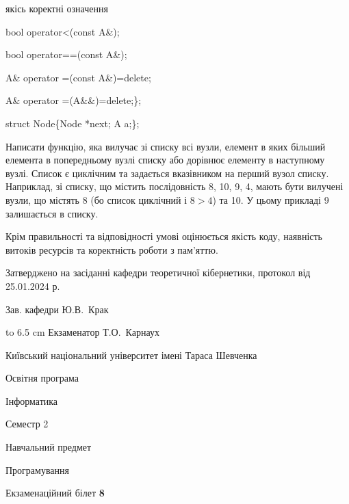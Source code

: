 \documentclass[12pt, ukrainian]{article}
\begin{document}
{\quad  якісь коректні означення 

\quad  bool operator<(const A\&); 

\quad  bool operator==(const A\&); 

\quad A\& operator =(const A\&)=delete; 

\quad  A\& operator =(A\&\&)=delete;\};

struct Node\{Node *next; A a;\};

 Написати функцію, яка вилучає зі списку всі вузли, елемент в яких більший елемента в попередньому вузлі списку або дорівнює елементу в наступному вузлі. Список є циклічним та задається вказівником на перший вузол списку. Наприклад, зі списку, що містить послідовність 8, 10, 9, 4, мають бути вилучені вузли, що містять 8 (бо список циклічний і $8>4$) та 10. У цьому прикладі 9 залишається в списку.

Крім правильності та відповідності умові оцінюється якість коду, наявність витоків ресурсів та коректність роботи з пам'яттю. 

}
{\smallskip\smallskip \begin {scriptsize} Затверджено на засіданні кафедри теоретичної кібернетики, протокол   від   25.01.2024 р.\par\smallskip\smallskip\smallskip\smallskip
{\parbox {6.5 cm} {Зав. кафедри \dotfill Ю.В.~Крак}}\hspace {0.7cm} {\hbox to 6.5 cm { Екзаменатор \dotfill Т.О.~Карнаух}} \end{scriptsize}}
\newpage
{{\begin {scriptsize}\par
{ \center  Київський національний університет імені Тараса Шевченка \par}
{\parbox {5 cm}{Освітня програма \hfill}{\parbox {7 cm}{Інформатика\hfill}}\parbox {6 cm}{\hfill Семестр 2}}\par
{\parbox {5 cm} {Навчальний предмет \hfill}\parbox {7 cm}{Програмування \hfill}\parbox {6cm}{\hfill}\par}\vspace{-15pt} \end{scriptsize}}{\center Екзаменаційний білет \No \textbf { 8 }\par}}
\end{document}
